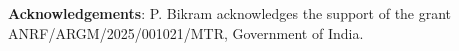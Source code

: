 \documentclass[11pt]{amsart}
\theoremstyle{definition}
\theoremstyle{myremark}
\numberwithin{equation}{section}
\begin{document}
	
	
	
	
	\noindent\textbf{Acknowledgements}: 
 P. Bikram acknowledges the support of the grant ANRF/ARGM/2025/001021/MTR, 
	Government of India. 

		
%	
%	
\end{document}
